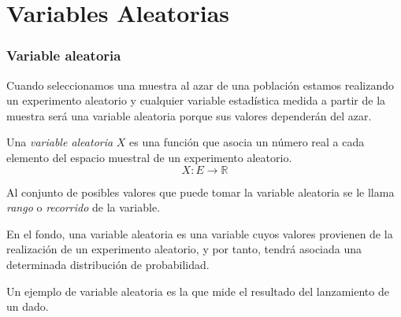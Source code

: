 \section{Variables Aleatorias}



\begin{frame}
\frametitle{Variable aleatoria}
Cuando seleccionamos una muestra al azar de una población estamos realizando un experimento aleatorio y cualquier variable
estadística medida a partir de la muestra será una variable aleatoria porque sus valores dependerán del azar. 

\begin{definicion} 
Una \emph{variable aleatoria} $X$ es una función que asocia un número real a cada elemento del
espacio muestral de un experimento aleatorio. \[ X:E\rightarrow \mathbb{R} \]

Al conjunto de posibles valores que puede tomar la variable aleatoria se le llama \emph{rango} o \emph{recorrido} de la variable.
\end{definicion}

En el fondo, una variable aleatoria es una variable cuyos valores provienen de la realización de un experimento aleatorio, y por tanto,
tendrá asociada una determinada distribución de probabilidad.

Un ejemplo de variable aleatoria es la que mide el resultado del lanzamiento de un dado.

\end{frame}
